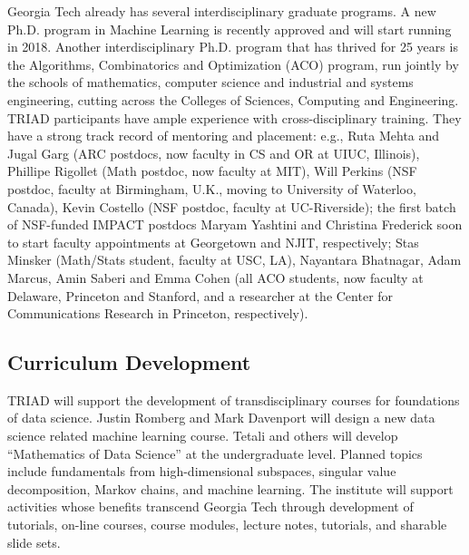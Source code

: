 \documentclass[12pt]{article}
\begin{document}
Georgia Tech already has several interdisciplinary graduate programs.
A new Ph.D. program in Machine Learning is recently approved and will start running in 2018.
Another interdisciplinary Ph.D. program that has thrived for 25 years is the Algorithms, Combinatorics and Optimization (ACO) program, run jointly by the schools of mathematics, computer science and industrial and systems engineering, cutting across the Colleges of Sciences, Computing and Engineering.
TRIAD participants have ample experience with cross-disciplinary training.
They have a strong track record of mentoring and placement: e.g.,
Ruta Mehta and Jugal Garg (ARC postdocs, now faculty in CS and OR at UIUC, Illinois),
Phillipe Rigollet (Math postdoc, now faculty at MIT),
Will Perkins (NSF postdoc, faculty at Birmingham, U.K., moving to University of Waterloo, Canada),
Kevin Costello (NSF postdoc, faculty at UC-Riverside);
the first batch of NSF-funded IMPACT postdocs Maryam Yashtini and Christina Frederick soon to start faculty appointments at Georgetown and NJIT, respectively;
Stas Minsker (Math/Stats student, faculty at USC, LA),
Nayantara Bhatnagar, Adam Marcus, Amin Saberi and Emma Cohen (all ACO students, now faculty at Delaware, Princeton and Stanford, and a researcher at the Center for Communications Research in Princeton, respectively).



\subsection{Curriculum Development}
\label{sec:courses}

TRIAD will support the development of transdisciplinary courses for foundations of data
science. Justin Romberg and Mark Davenport will design a new data science related machine
learning course. Tetali and others will develop ``Mathematics of Data Science'' at the undergraduate level.
Planned topics include fundamentals from high-dimensional subspaces,
singular value decomposition,
Markov chains, and machine learning.
The institute will support activities whose benefits transcend Georgia Tech through
development of tutorials, on-line courses, course modules, lecture notes, tutorials, and
sharable slide sets.
\end{document}

